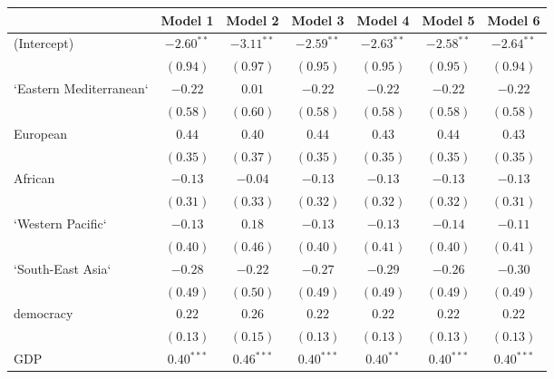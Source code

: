 
\begin{table}[!h]
\begin{center}
\begin{tabular}{l c c c c c c }
\toprule
 & Model 1 & Model 2 & Model 3 & Model 4 & Model 5 & Model 6 \\
\midrule
(Intercept)             & $-2.60^{**}$ & $-3.11^{**}$ & $-2.59^{**}$ & $-2.63^{**}$ & $-2.58^{**}$ & $-2.64^{**}$ \\
                        & $(0.94)$     & $(0.97)$     & $(0.95)$     & $(0.95)$     & $(0.95)$     & $(0.94)$     \\
`Eastern Mediterranean` & $-0.22$      & $0.01$       & $-0.22$      & $-0.22$      & $-0.22$      & $-0.22$      \\
                        & $(0.58)$     & $(0.60)$     & $(0.58)$     & $(0.58)$     & $(0.58)$     & $(0.58)$     \\
European                & $0.44$       & $0.40$       & $0.44$       & $0.43$       & $0.44$       & $0.43$       \\
                        & $(0.35)$     & $(0.37)$     & $(0.35)$     & $(0.35)$     & $(0.35)$     & $(0.35)$     \\
African                 & $-0.13$      & $-0.04$      & $-0.13$      & $-0.13$      & $-0.13$      & $-0.13$      \\
                        & $(0.31)$     & $(0.33)$     & $(0.32)$     & $(0.32)$     & $(0.32)$     & $(0.31)$     \\
`Western Pacific`       & $-0.13$      & $0.18$       & $-0.13$      & $-0.13$      & $-0.14$      & $-0.11$      \\
                        & $(0.40)$     & $(0.46)$     & $(0.40)$     & $(0.41)$     & $(0.40)$     & $(0.41)$     \\
`South-East Asia`       & $-0.28$      & $-0.22$      & $-0.27$      & $-0.29$      & $-0.26$      & $-0.30$      \\
                        & $(0.49)$     & $(0.50)$     & $(0.49)$     & $(0.49)$     & $(0.49)$     & $(0.49)$     \\
democracy               & $0.22$       & $0.26$       & $0.22$       & $0.22$       & $0.22$       & $0.22$       \\
                        & $(0.13)$     & $(0.15)$     & $(0.13)$     & $(0.13)$     & $(0.13)$     & $(0.13)$     \\
GDP                     & $0.40^{***}$ & $0.46^{***}$ & $0.40^{***}$ & $0.40^{**}$  & $0.40^{***}$ & $0.40^{***}$ \\

\end{tabular}
\end{center}
\end{table}

